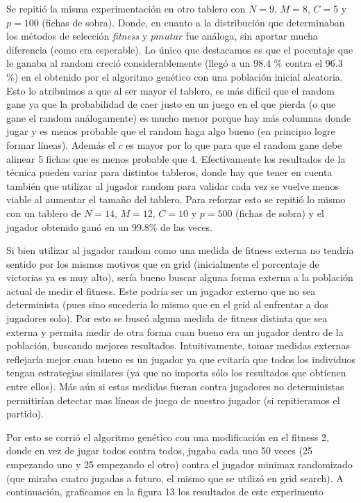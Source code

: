 \documentclass[A4paper,oneside,fleqn,11pt]{article}
\theoremstyle{definition}
\begin{document}
Se repitió la misma experimentación en otro tablero con $N=9$, $M=8$, $C=5$ y $p=100$ (fichas de sobra). Donde, en cuanto a la distribución que determinaban los métodos de selección \textit{fitness} y $pmutar$ fue análoga, sin aportar mucha diferencia (como era esperable). Lo único que destacamos es que el pocentaje que le ganaba al random creció considerablemente (llegó a un 98.4 \% contra el 96.3 \%) en el obtenido por el algoritmo genético con una población inicial aleatoria. Esto lo atribuimos a que al ser mayor el tablero, es más difícil que el random gane ya que la probabilidad de caer justo en un juego en el que pierda (o que gane el random análogamente) es mucho menor porque hay más columnas donde jugar y es menos probable que el random haga algo bueno (en principio logre formar líneas). Además el $c$ es mayor por lo que para que el random gane debe alinear 5 fichas que es menos probable que 4. Efectivamente los resultados de la técnica pueden variar para distintos tableros, donde hay que tener en cuenta también que utilizar al jugador random para validar cada vez se vuelve menos viable al aumentar el tamaño del tablero. Para reforzar esto se repitió lo mismo con un tablero de $N=14$, $M=12$, $C=10$ y $p=500$ (fichas de sobra) y el jugador obtenido ganó en un 99.8\% de las veces.


Si bien utilizar al jugador random como una medida de fitness externa no tendría sentido por los mismos motivos que en grid (inicialmente el porcentaje de victorias ya es muy alto), sería bueno buscar alguna forma externa a la población actual de medir el fitness. Este podría ser un jugador externo que no sea determinista (pues sino sucederia lo mismo que en el grid al enfrentar a dos jugadores solo). Por esto se buscó alguna medida de fitness distinta que sea externa y permita medir de otra forma cuan bueno era un jugador dentro de la población, buscando mejores resultados. Intuitivamente, tomar medidas externas reflejaría mejor cuan bueno es un jugador ya que evitaría que todos los individuos tengan estrategias similares (ya que no importa sólo los resultados que obtienen entre ellos). Más aún si estas medidas fueran contra jugadores no deterministas permitirían detectar mas líneas de juego de nuestro jugador (si repitieramos el partido). 

Por esto se corrió el algoritmo genético con una modificación en el fitness 2, donde en vez de jugar todos contra todos, jugaba cada uno 50 veces (25 empezando uno y 25 empezando el otro) contra el jugador minimax randomizado (que miraba cuatro jugadas a futuro, el mismo que se utilizó en grid search). A continuación, graficamos en la figura 13 los resultados de este experimento
\end{document}
